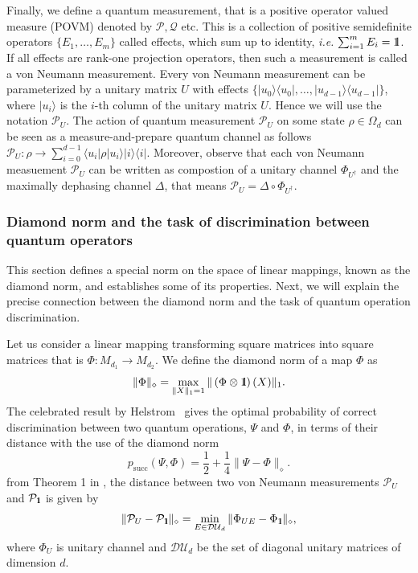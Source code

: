 \documentclass[preprint,12pt, a4paper]{elsarticle}
\newcommand{\ie}{{\emph{i.e.\/}}}
\newcommand{\ket}[1]{\ensuremath{|#1\rangle}}
\newcommand{\bra}[1]{\ensuremath{\langle#1|}}
\newcommand{\ketbra}[2]{\ensuremath{\ket{#1}\bra{#2}}}
\newcommand{\proj}[1]{\ensuremath{\ketbra{#1}{#1}}}
\newcommand{\1}{{\rm 1\hspace{-0.9mm}l}}
\newcommand{\Id}{{\rm 1\hspace{-0.9mm}l}}
\newcommand{\PP}{\mathcal{P}}
\newcommand{\diaguni}{\ensuremath{\mathcal{DU}}}
\begin{document}
Finally, we define a quantum
measurement, that is a positive operator valued measure (POVM) denoted by $\PP, \mathcal{Q}$ etc. This is a 
collection of positive semidefinite operators $\{E_1, \ldots, E_m \}$ called
effects, which sum up to identity, \ie $ \, \, \sum_{i=1}^m E_i = \1$. If
all effects are rank-one projection operators, then such a measurement is
called a von Neumann measurement. 
Every von Neumann measurement can be
parameterized by a unitary matrix $U$ with effects $\{\proj{u_0}, \ldots, \proj{u_{d-1}}\}$,
where $\ket{u_i}$ is the $i$-th column of the unitary matrix $U$.  Hence we will use the notation $\PP_{U}$.  The action of
quantum measurement $\PP_{U}$ on some state $\rho \in \Omega_d$ can be
seen as  a measure-and-prepare quantum channel as follows 
$
\PP_{U} : \rho \rightarrow \sum_{i=0}^{d-1} \bra{u_i} \rho \ket{u_i} \proj{i}.
$ Moreover, observe that each von Neumann measuement $\PP_{U}$ can be written as compostion of a unitary channel $\Phi_{U^\dagger}$ and the maximally dephasing channel $\Delta$, that means $\PP_{U} = \Delta \circ \Phi_{U^\dagger}$. 

\subsubsection{Diamond norm and the task of discrimination between quantum operators}
This section defines a special norm on the space of linear mappings, known as 
the diamond norm, and establishes some of its properties. 
Next, we will explain the precise connection between the diamond
norm and the task of quantum operation discrimination. 

Let us  consider a  linear mapping transforming  square matrices into square 
matrices that is $\Phi: M_{d_1} \to M_{d_2}$. 
We define the diamond norm of a map $\Phi$ as 
\begin{equation}
\|\Phi\|_\diamond = \max_{\|X\|_1=1} \| \left(\Phi \otimes \1\right) (X) \|_1.
\end{equation}
The celebrated result by Helstrom~\cite{helstrom1976quantum} gives the optimal  probability of correct discrimination between two quantum operations, $\Psi$  and $\Phi$, 
in terms of their distance with the use of the diamond norm
\begin{equation}
p_{\text{succ}}(\Psi, \Phi) =  \frac12 + \frac14 \| \Psi - \Phi \|_\diamond.
\end{equation}
from Theorem 1 in \cite{puchala2018strategies}, the distance between two von Neumann measurements $\PP_U$ and 
$\PP_\Id$ is given by
\begin{equation}
\|\PP_U - \PP_\Id\|_\diamond = \min_{E \in \diaguni_d} \|\Phi_{UE} - 
\Phi_\Id\|_\diamond,
\end{equation}
where $\Phi_U$ is unitary channel and $\diaguni_d$ be the set of diagonal 
unitary matrices of dimension $d$. 
\end{document}
